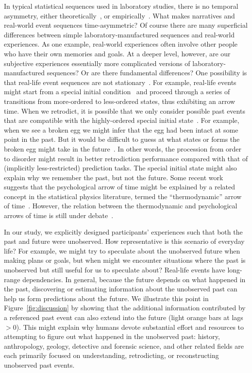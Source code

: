 \documentclass[10pt]{article}
\begin{document}
In typical statistical sequences used in laboratory studies, there is no
temporal asymmetry, either theoretically~\citep{Cove94, BialEtal01,
ElliEtal09}, or empirically~\citep{JonePash07}. What makes narratives and
real-world event sequences time-asymmetric? Of course there are many
superficial differences between simple laboratory-manufactured sequences and
real-world experiences. As one example, real-world experiences often involve
other people who have their own memories and goals. At a deeper level, however,
are our subjective experiences essentially more complicated versions of
laboratory-manufactured sequences? Or are there fundamental differences? One
possibility is that real-life event sequences are not stationary~\citep[i.e.,
not in equilibrium,][]{Cove94}. For example, real-life events might start from
a special initial condition~\citep{Albe00, Feyn65, Cove94} and proceed through
a series of transitions from more-ordered to less-ordered states, thus
exhibiting an arrow time. When we retrodict, it is possible that we only
consider possible past events that are compatible with the highly-ordered
special initial state~\citep{Carr10, Carr16}. For example, when we see a broken
egg we might infer that the egg had been intact at some point in the past. But
it would be difficult to guess at what states or forms the broken egg might
take in the future~\citep{Carr10, Carr16}. In other words, the procession from
order to disorder might result in better retrodiction performance compared with
that of (implicitly less-restricted) prediction tasks. The special initial
state might also explain why we remember the past, but not the future. Some
recent work suggests that the psychological arrow of time might be explained by
a related concept in the statistical physics literature, termed the
``thermodynamic'' arrow of time~\citep{MlodBrun14, Rove22}. However, the
relation between the thermodynamic and psychological arrows of time is still
under debate~\citep{Golo21, HemmShen19}.

In our study, we explicitly designed participants' experiences such that both
the past and future were unobserved. How representative is this scenario of
everyday life? For example, we might try to speculate about the unobserved
future when making plans or goals, but when might we encounter situations where
the past is unobserved but still useful for us to speculate about? Real-life
events have long-range dependencies. In general, because the future depends on
what happened in the past, discovering or estimating information about the
unobserved past can help us form predictions about the future. We illustrate
this point in Figure~\ref{fig:discussion} by showing that the additional
information contributed by a referenced past event can also extend into the
future (light orange bars at lags $> 0$). This might explain why humans devote
substantial effort and resources to attempting to figure out what happened in
the unobserved past: history, anthropology, geology, detective and forensic
science, and other related fields are each primarily focused on understanding,
retrodicting, or reconstructing unobserved past events.
\end{document}
